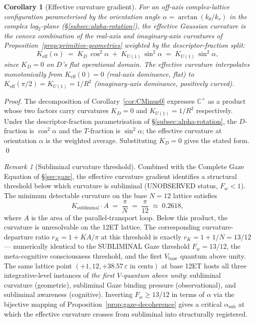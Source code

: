 \documentclass[11pt,a4paper]{article}
\newtheorem{corollary}[theorem]{Corollary}
\theoremstyle{definition}
\theoremstyle{remark}
\newtheorem{remark}[theorem]{Remark}
\newcommand{\C}{\mathbb{C}}
\newcommand{\eps}{\varepsilon}
\begin{document}
\begin{corollary}[Effective curvature gradient]\label{cor:K-eff}
For an off-axis complex-lattice configuration parameterised by the orientation angle $\alpha = \arctan(k_{\theta}/k_{r})$ in the complex log$_{2}$-plane (\S\ref{subsec:alpha-rotation}), the effective Gaussian curvature is the convex combination of the real-axis and imaginary-axis curvatures of Proposition~\ref{prop:primitive-geometries} weighted by the descriptor-fraction split:
\[
K_{\mathrm{eff}}(\alpha) \;=\; K_{D}\,\cos^{2}\alpha \;+\; K_{U(1)}\,\sin^{2}\alpha \;=\; K_{U(1)}\,\sin^{2}\alpha,
\]
since $K_{D} = 0$ on $D$'s flat operational domain. The effective curvature interpolates monotonically from $K_{\mathrm{eff}}(0) = 0$ (real-axis dominance, flat) to $K_{\mathrm{eff}}(\pi/2) = K_{U(1)} = 1/R^{2}$ (imaginary-axis dominance, positively curved).
\end{corollary}

\begin{proof}
The decomposition of Corollary~\ref{cor:CMinus0} expresses $\C^{\times}$ as a product whose two factors carry curvatures $K_{D} = 0$ and $K_{U(1)} = 1/R^{2}$ respectively. Under the descriptor-fraction parametrisation of \S\ref{subsec:alpha-rotation}, the $D$-fraction is $\cos^{2}\alpha$ and the $T$-fraction is $\sin^{2}\alpha$; the effective curvature at orientation $\alpha$ is the weighted average. Substituting $K_{D} = 0$ gives the stated form. \qed
\end{proof}

\begin{remark}[Subliminal curvature threshold]\label{rem:subliminal-curvature}
Combined with the Complete Gaze Equation of \S\ref{sec:gaze}, the effective curvature gradient identifies a structural threshold below which curvature is subliminal (UNOBSERVED status, $F_{w} < 1$). The minimum detectable curvature on the base $N=12$ lattice satisfies
\begin{equation}\label{eq:subliminal-curvature-threshold}
K_{\mathrm{subliminal}} \cdot A \;=\; \frac{\pi}{N} \;=\; \frac{\pi}{12} \;\approx\; 0.2618,
\end{equation}
where $A$ is the area of the parallel-transport loop. Below this product, the curvature is unresolvable on the 12ET lattice. The corresponding curvature-departure ratio $r_{K} = 1 + KA/\pi$ at this threshold is exactly $r_{K} = 1 + 1/N = 13/12$ --- numerically identical to the SUBLIMINAL Gaze threshold $F_{w} = 13/12$, the meta-cognitive consciousness threshold, and the first $V_{\mathrm{base}}$ quantum above unity. The same lattice point $(+1, 12, +38.57\,\eps\text{ in cents})$ at base 12ET hosts all three integrative-level instances of \emph{the first $V$-quantum above unity}: subliminal curvature (geometric), subliminal Gaze binding pressure (observational), and subliminal awareness (cognitive). Inverting $F_{w} \ge 13/12$ in terms of $\alpha$ via the bijective mapping of Proposition~\ref{prop:gaze-decoherence} gives a critical $\alpha_{\mathrm{sub}}$ at which the effective curvature crosses from subliminal into structurally registered.
\end{remark}
\end{document}

